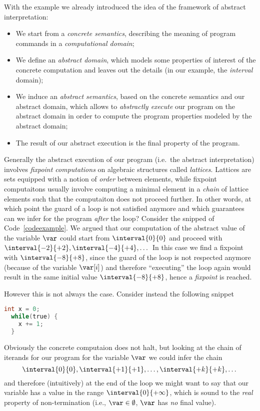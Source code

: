 \medskip

\noindent
With the example we already introduced the idea of the framework of
abstract interpretation:
\begin{itemize}
\item We start from a \emph{concrete semantics}, describing the
  meaning of program commands in a \emph{computational domain};
\item We define an \emph{abstract domain}, which models some
  properties of interest of the concrete computation and leaves out
  the details (in our example, the \emph{interval} domain);
\item We induce an \emph{abstract semantics}, based on the concrete
  semantics and our abstract domain, which allows to \emph{abstractly
    execute} our program on the abstract domain in order to compute
  the program properties modeled by the abstract domain;
\item The result of our abstract execution is the final property of
  the program.
\end{itemize}
Generally the abstract execution of our program (i.e.\ the abstract
interpretation) involves \emph{fixpoint computations} on algebraic
structures called \emph{lattices}. Lattices are sets equipped with a
notion of \emph{order} between elements, while fixpoint computaitons
usually involve computing a minimal element in a \emph{chain} of
lattice elements such that the computaiton does not proceed further.
In other words, at which point the guard of a loop is not satisfied
anymore and which guarantees can we infer for the program \emph{after}
the loop? Consider the snipped of Code~\ref{codeexample}. We argued
that our computation of the abstract value of the variable \(\var\)
could start from \(\interval{0}{0}\) and proceed with
\(\interval{-2}{+2}, \interval{-4}{+4}, \dots\) In this case we find a
fixpoint with \(\interval{-8}{+8}\), since the guard of the loop is
not respected anymore (because of the variable \(\var[i]\)) and
therefore ``executing'' the loop again would result in the same
initial value \(\interval{-8}{+8}\), hence a \emph{fixpoint} is
reached.

\medskip

\noindent
However this is not always the case. Consider instead the following
snippet
\begin{lstlisting}[language=C, label=exampleloop]
  int x = 0;
  while(true) {
    x += 1;
  }
\end{lstlisting}
Obviously the concrete computaion does not halt, but looking at the
chain of iterands for our program for the variable \(\var\) we could
infer the chain
\begin{equation*}
  \interval{0}{0}, \interval{+1}{+1}, \dots, \interval{+k}{+k}, \dots
\end{equation*}
and therefore (intuitively) at the end of the loop we might want to
say that our variable has a value in the range
\(\interval{0}{+\infty}\), which is sound to the \emph{real} property
of non-termination (i.e., \(\var\in\emptyset\), \(\var\) has
\emph{no} final value).

